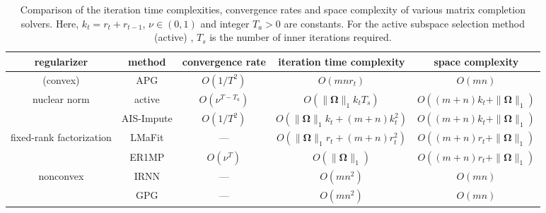 \documentclass[10pt,journal,compsoc]{IEEEtran}
\newcommand{\NM}[2]{\| #1 \|_{#2} }
\begin{document}
\begin{table*}[ht]
\centering
\renewcommand{\arraystretch}{1.2}
\caption{Comparison of the iteration time complexities, convergence rates and space
complexity
of various matrix completion solvers.  
Here, $k_t = r_t + r_{t - 1}$, $\nu \in (0,1)$ and integer $T_a > 0$ are constants.  For the
active subspace selection method (\textsf{active}) \cite{hsieh2014nuclear}, $T_s$ is the number of inner iterations  required.}
\vspace{-10px}
\begin{tabular}{c | c | c | c | c}
	\hline
	      regularizer        & method                                                   & convergence rate   & iteration time complexity                                       & space complexity                          \\ \hline
	        (convex)         & \textsf{APG} \cite{ji2009accelerated,toh2010accelerated} & $O(1/T^2)$         & $O(m n r_t)$                                                    & $O(mn)$                                   \\ \cline{2-5}
	      nuclear norm       & \textsf{active} \cite{hsieh2014nuclear}                  & $O(\nu^{T - T_a})$ & $O( \NM{\mathbf{\Omega}}{1} k_t T_{s})$                         & $O((m + n)k_t + \NM{\mathbf{\Omega}}{1})$ \\ \cline{2-5}
	                         & \textsf{AIS-Impute} \cite{quan2015impute}                & $O(1/T^2)$         & $O(\NM{\mathbf{\Omega}}{1} k_t + (m + n)k^2_t)$                 & $O((m + n)k_t + \NM{\mathbf{\Omega}}{1})$ \\ \hline
	fixed-rank factorization & \textsf{LMaFit} \cite{wen2012solving}                    & ---                & $O( \NM{\mathbf{\Omega}}{1} r_t + (m + n)r_t^2)$                & $O((m + n)r_t + \NM{\mathbf{\Omega}}{1})$ \\ \cline{2-5}
	                         & \textsf{ER1MP} \cite{wang2015orthogonal}                 & $O(\nu^T)$         & $O(\NM{\mathbf{\Omega}}{1})$                                    & $O((m + n)r_t + \NM{\mathbf{\Omega}}{1})$ \\ \hline
	       nonconvex         & \textsf{IRNN} \cite{lu2016nonconvex}                     & ---                & $O(m n^2)$                                                      & $O(mn)$                                   \\ \cline{2-5}
	                         & \textsf{GPG} \cite{lu2015generalized}                    & ---                & $O(m n^2)$                                                      & $O(mn)$                                   \\ \cline{2-5}

\end{tabular}
\end{table*}
\end{document}
